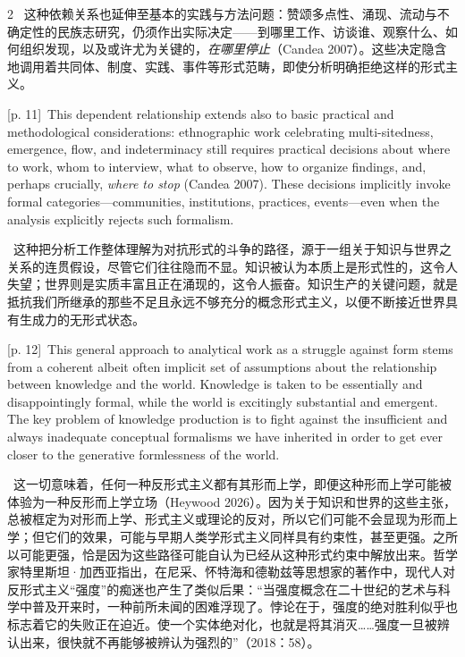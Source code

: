 \documentclass[10pt,a4paper]{article}
\begin{document}
\begin{paracol}{2}
\switchcolumn*
{\scriptsize\color{gray} [p. 11]}\ 这种依赖关系也延伸至基本的实践与方法问题：赞颂多点性、涌现、流动与不确定性的民族志研究，仍须作出实际决定——到哪里工作、访谈谁、观察什么、如何组织发现，以及或许尤为关键的，\textit{在哪里停止}（Candea 2007）。这些决定隐含地调用着共同体、制度、实践、事件等形式范畴，即使分析明确拒绝这样的形式主义。\par
\switchcolumn
{\scriptsize\color{gray} [p. 11]}\ This dependent relationship extends also to basic practical and methodological considerations: ethnographic work celebrating multi-sitedness, emergence, flow, and indeterminacy still requires practical decisions about where to work, whom to interview, what to observe, how to organize findings, and, perhaps crucially, \textit{where to stop} (Candea 2007). These decisions implicitly invoke formal categories—communities, institutions, practices, events—even when the analysis explicitly rejects such formalism.\par
\switchcolumn*
{\scriptsize\color{gray} [p. 12]}\ 这种把分析工作整体理解为对抗形式的斗争的路径，源于一组关于知识与世界之关系的连贯假设，尽管它们往往隐而不显。知识被认为本质上是形式性的，这令人失望；世界则是实质丰富且正在涌现的，这令人振奋。知识生产的关键问题，就是抵抗我们所继承的那些不足且永远不够充分的概念形式主义，以便不断接近世界具有生成力的无形式状态。\par
\switchcolumn
{\scriptsize\color{gray} [p. 12]}\ This general approach to analytical work as a struggle against form stems from a coherent albeit often implicit set of assumptions about the relationship between knowledge and the world. Knowledge is taken to be essentially and disappointingly formal, while the world is excitingly substantial and emergent. The key problem of knowledge production is to fight against the insufficient and always inadequate conceptual formalisms we have inherited in order to get ever closer to the generative formlessness of the world.\par
\switchcolumn*
{\scriptsize\color{gray} [p. 12]}\ 这一切意味着，任何一种反形式主义都有其形而上学，即便这种形而上学可能被体验为一种反形而上学立场（Heywood 2026）。因为关于知识和世界的这些主张，总被框定为对形而上学、形式主义或理论的反对，所以它们可能不会显现为形而上学；但它们的效果，可能与早期人类学形式主义同样具有约束性，甚至更强。之所以可能更强，恰是因为这些路径可能自认为已经从这种形式约束中解放出来。哲学家特里斯坦·加西亚指出，在尼采、怀特海和德勒兹等思想家的著作中，现代人对反形式主义“强度”的痴迷也产生了类似后果：“当强度概念在二十世纪的艺术与科学中普及开来时，一种前所未闻的困难浮现了。悖论在于，强度的绝对胜利似乎也标志着它的失败正在迫近。使一个实体绝对化，也就是将其消灭……强度一旦被辨认出来，很快就不再能够被辨认为强烈的”（2018：58）。\par

\end{paracol}
\end{document}
